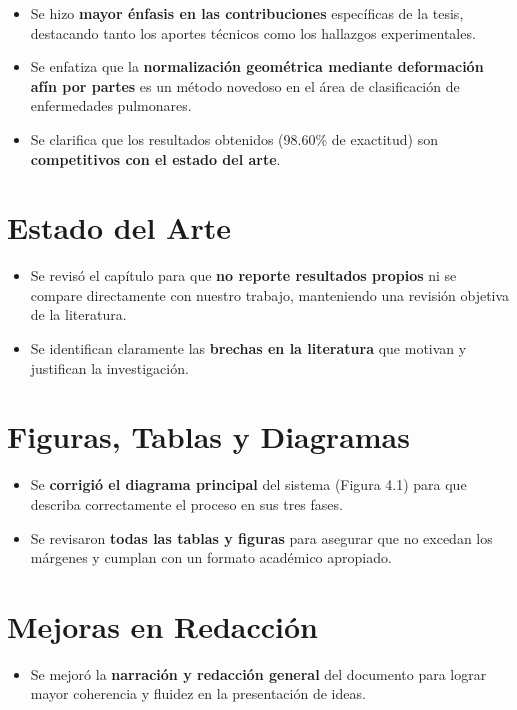 \documentclass[12pt,letterpaper]{article}
\begin{document}
\begin{itemize}[leftmargin=*, itemsep=0.3em]
    \item Se hizo \textbf{mayor énfasis en las contribuciones} específicas de la tesis, destacando tanto los aportes técnicos como los hallazgos experimentales.
    \item Se enfatiza que la \textbf{normalización geométrica mediante deformación afín por partes} es un método novedoso en el área de clasificación de enfermedades pulmonares.
    \item Se clarifica que los resultados obtenidos (98.60\% de exactitud) son \textbf{competitivos con el estado del arte}.
\end{itemize}

\section{Estado del Arte}

\begin{itemize}[leftmargin=*, itemsep=0.3em]
    \item Se revisó el capítulo para que \textbf{no reporte resultados propios} ni se compare directamente con nuestro trabajo, manteniendo una revisión objetiva de la literatura.
    \item Se identifican claramente las \textbf{brechas en la literatura} que motivan y justifican la investigación.
\end{itemize}

\section{Figuras, Tablas y Diagramas}

\begin{itemize}[leftmargin=*, itemsep=0.3em]
    \item Se \textbf{corrigió el diagrama principal} del sistema (Figura 4.1) para que describa correctamente el proceso en sus tres fases.
    \item Se revisaron \textbf{todas las tablas y figuras} para asegurar que no excedan los márgenes y cumplan con un formato académico apropiado.
\end{itemize}

\section{Mejoras en Redacción}

\begin{itemize}[leftmargin=*, itemsep=0.3em]
    \item Se mejoró la \textbf{narración y redacción general} del documento para lograr mayor coherencia y fluidez en la presentación de ideas.
\end{itemize}
\end{document}
